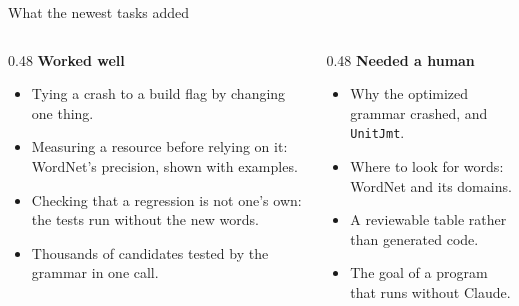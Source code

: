 \documentclass[10pt,aspectratio=169]{beamer}
\newcommand{\bad}[1]{\textcolor{warn}{#1}}
\newcommand{\ok}[1]{\textcolor{good}{#1}}
\begin{document}
\begin{frame}{What the newest tasks added}
  \begin{columns}[T]
    \begin{column}{0.48\textwidth}
      \ok{\textbf{Worked well}}
      \begin{itemize}\small
        \item Tying a crash to a build flag by changing one thing.
        \item Measuring a resource before relying on it: WordNet's precision, shown with
              examples.
        \item Checking that a regression is not one's own: the tests run without the new
              words.
        \item Thousands of candidates tested by the grammar in one call.
      \end{itemize}
    \end{column}
    \begin{column}{0.48\textwidth}
      \bad{\textbf{Needed a human}}
      \begin{itemize}\small
        \item Why the optimized grammar crashed, and \texttt{UnitJmt}.
        \item Where to look for words: WordNet and its domains.
        \item A reviewable table rather than generated code.
        \item The goal of a program that runs without Claude.
      \end{itemize}
    \end{column}
  \end{columns}
\end{frame}
\end{document}
